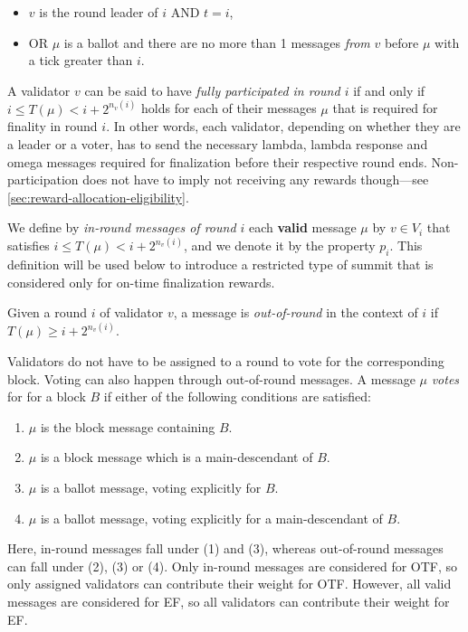 \begin{itemize}
\item
  $v$ is the round leader of $i$ AND $t = i$,
\item
  OR $\mu$ is a ballot and there are no more than 1 messages
  \emph{from} $v$ before $\mu$ with a tick greater than $i$.
\end{itemize}

A validator $v$ can be said to have \emph{fully participated in round $i$} if and only if $i \leq T(\mu) <i+2^{n_v(i)}$ holds for each of their messages $\mu$ that is required for finality in round $i$. In other words, each validator, depending on whether they are a leader or a voter, has to send the necessary lambda, lambda response and omega messages required for finalization before their respective round ends. Non-participation does not have to imply not receiving any rewards though---see \ref{sec:reward-allocation-eligibility}.

We define by \emph{in-round messages of round $i$} each \textbf{valid} message $\mu$ by $v\in V_i$ that satisfies $i \leq T(\mu)< i+2^{n_v(i)}$, and we denote it by the property $p_i$. This definition will be used below to introduce a restricted type of summit that is considered only for on-time finalization rewards.

Given a round $i$ of validator $v$, a message is \emph{out-of-round} in the context of $i$ if $T(\mu)\geq i+2^{n_v(i)}$.

Validators do not have to be assigned to a round to vote for the corresponding block. Voting can also happen through out-of-round messages. A message $\mu$ \emph{votes} for for a block $B$ if either of the following conditions are satisfied:

\begin{enumerate}
\def\labelenumi{\arabic{enumi}.}
\item $\mu$ is the block message containing $B$.
\item $\mu$ is a block message which is a main-descendant of $B$.
\item $\mu$ is a ballot message, voting explicitly for $B$.
\item $\mu$ is a ballot message, voting explicitly for a main-descendant of $B$.
\end{enumerate}

Here, in-round messages fall under (1) and (3), whereas out-of-round messages can fall under (2), (3) or (4). Only in-round messages are considered for OTF, so only assigned validators can contribute their weight for OTF. However, all valid messages are considered for EF, so all validators can contribute their weight for EF.

